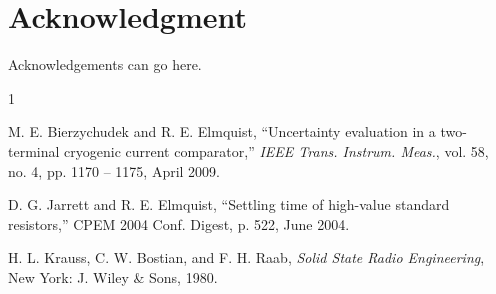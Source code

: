 \documentclass[]{IEEEtran}
\begin{document}
\section*{Acknowledgment}
Acknowledgements can go here.





%
%
%
\begin{thebibliography}{1}

M. E. Bierzychudek and R. E. Elmquist, “Uncertainty evaluation in a two-terminal cryogenic current comparator,” \emph{IEEE Trans. Instrum. Meas.}, vol. 58, no. 4, pp. 1170 – 1175, April 2009.

D. G. Jarrett and R. E. Elmquist, ``Settling time of high-value standard resistors,'' CPEM 2004 Conf. Digest, p. 522, June 2004.


H. L. Krauss, C. W. Bostian, and F. H. Raab, \emph{Solid State Radio Engineering}, New York: J. Wiley \& Sons, 1980.

\end{thebibliography}



\end{document}
